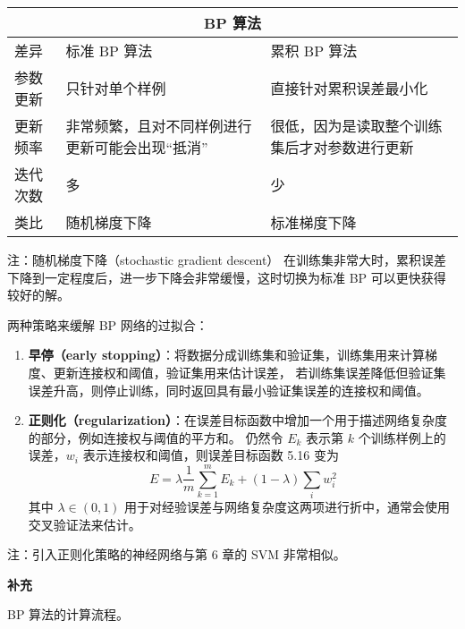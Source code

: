 \documentclass[../studies-ml.tex]{subfiles}
\begin{document}
\begin{center}
  \begin{tabular}{ |p{2cm}||p{5cm}|p{5cm}|  }
    \hline
    \multicolumn{3}{|c|}{\textbf{BP 算法}}                     \\
    \hline
    差异   & 标准 BP 算法                 & 累积 BP 算法               \\
    \hline
    参数更新 & 只针对单个样例                  & 直接针对累积误差最小化            \\
    \hline
    更新频率 & 非常频繁，且对不同样例进行更新可能会出现“抵消” & 很低，因为是读取整个训练集后才对参数进行更新 \\
    \hline
    迭代次数 & 多                        & 少                      \\
    \hline
    类比   & 随机梯度下降                   & 标准梯度下降                 \\
    \hline
  \end{tabular}
\end{center}

注：随机梯度下降（stochastic gradient descent）
在训练集非常大时，累积误差下降到一定程度后，进一步下降会非常缓慢，这时切换为标准 BP 可以更快获得较好的解。

两种策略来缓解 BP 网络的过拟合：
\begin{enumerate}
  \item \textbf{早停（early stopping）}：将数据分成训练集和验证集，训练集用来计算梯度、更新连接权和阈值，验证集用来估计误差，
        若训练集误差降低但验证集误差升高，则停止训练，同时返回具有最小验证集误差的连接权和阈值。
  \item \textbf{正则化（regularization）}：在误差目标函数中增加一个用于描述网络复杂度的部分，例如连接权与阈值的平方和。
        仍然令 $E_k$ 表示第 $k$ 个训练样例上的误差，$w_i$ 表示连接权和阈值，则误差目标函数 5.16 变为
        \begin{equation}
          E = \lambda \frac{1}{m} \sum_{k=1}^{m} E_k + (1-\lambda) \sum_{i} w_i^2
        \end{equation}
        其中 $\lambda \in (0,1)$ 用于对经验误差与网络复杂度这两项进行折中，通常会使用交叉验证法来估计。
\end{enumerate}

注：引入正则化策略的神经网络与第 6 章的 SVM 非常相似。

\newpage
\textbf{补充}

BP 算法的计算流程。
\end{document}
